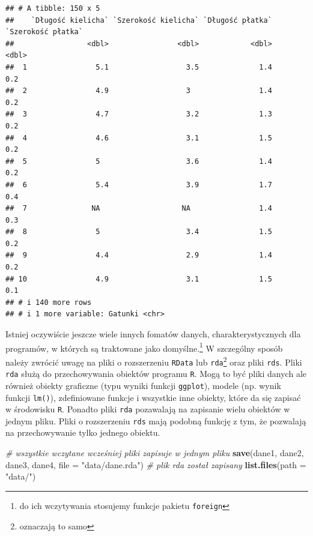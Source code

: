 \documentclass[
]{book}
\newenvironment{Shaded}{\begin{snugshade}}{\end{snugshade}}
\newcommand{\AttributeTok}[1]{\textcolor[rgb]{0.13,0.29,0.53}{#1}}
\newcommand{\CommentTok}[1]{\textcolor[rgb]{0.56,0.35,0.01}{\textit{#1}}}
\newcommand{\FunctionTok}[1]{\textcolor[rgb]{0.13,0.29,0.53}{\textbf{#1}}}
\newcommand{\NormalTok}[1]{#1}
\newcommand{\StringTok}[1]{\textcolor[rgb]{0.31,0.60,0.02}{#1}}
\theoremstyle{plain}
\theoremstyle{definition}
\theoremstyle{definition}
\theoremstyle{definition}
\theoremstyle{definition}
\theoremstyle{definition}
\theoremstyle{remark}
\begin{document}
\begin{verbatim}
## # A tibble: 150 x 5
##    `Długość kielicha` `Szerokość kielicha` `Długość płatka` `Szerokość płatka`
##                 <dbl>                <dbl>            <dbl>              <dbl>
##  1                5.1                  3.5              1.4                0.2
##  2                4.9                  3                1.4                0.2
##  3                4.7                  3.2              1.3                0.2
##  4                4.6                  3.1              1.5                0.2
##  5                5                    3.6              1.4                0.2
##  6                5.4                  3.9              1.7                0.4
##  7               NA                   NA                1.4                0.3
##  8                5                    3.4              1.5                0.2
##  9                4.4                  2.9              1.4                0.2
## 10                4.9                  3.1              1.5                0.1
## # i 140 more rows
## # i 1 more variable: Gatunki <chr>
\end{verbatim}

Istniej oczywiście jeszcze wiele innych fomatów danych, charakterystycznych dla programów, w których są traktowane jako domyślne.\footnote{do ich wczytywania stosujemy funkcje pakietu \texttt{foreign}} W szczególny sposób należy zwrócić uwagę na pliki o rozszerzeniu \texttt{RData} lub \texttt{rda}\footnote{oznaczają to samo} oraz pliki \texttt{rds}. Pliki \texttt{rda} służą do przechowywania obiektów programu \texttt{R}. Mogą to być pliki danych ale również obiekty graficzne (typu wyniki funkcji \texttt{ggplot}), modele (np. wynik funkcji \texttt{lm()}), zdefiniowane funkcje i wszystkie inne obiekty, które da się zapisać w środowisku \texttt{R}. Ponadto pliki \texttt{rda} pozawalają na zapisanie wielu obiektów w jednym pliku. Pliki o rozszerzeniu \texttt{rds} mają podobną funkcję z tym, że pozwalają na przechowywanie tylko jednego obiektu.

\begin{Shaded}
\begin{Highlighting}[]
\CommentTok{\# wszystkie wczytane wcześniej pliki zapisuje w jednym pliku}
\FunctionTok{save}\NormalTok{(dane1, dane2, dane3, dane4, }\AttributeTok{file =} \StringTok{"data/dane.rda"}\NormalTok{)}
\CommentTok{\# plik rda został zapisany}
\FunctionTok{list.files}\NormalTok{(}\AttributeTok{path =} \StringTok{"data/"}\NormalTok{)}
\end{Highlighting}
\end{Shaded}
\end{document}
